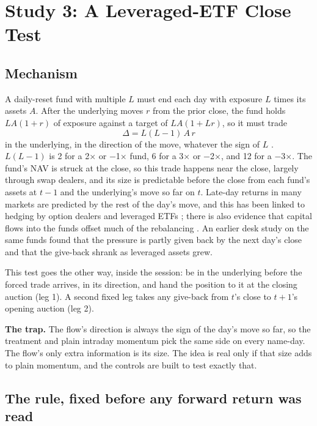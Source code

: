 \documentclass[10pt, a4paper, twocolumn]{article}
\begin{document}
\section{Study 3: A Leveraged-ETF Close Test}
\label{sec:etf}

\subsection{Mechanism}

A daily-reset fund with multiple $L$ must end each day with exposure $L$ times its assets $A$. After the underlying moves $r$ from the prior close, the fund holds $LA(1+r)$ of exposure against a target of $LA(1+Lr)$, so it must trade
\begin{equation}
\Delta = L(L-1)\,A\,r
\end{equation}
in the underlying, in the direction of the move, whatever the sign of $L$ \cite{cheng2009}. $L(L-1)$ is 2 for a 2$\times$ or $-$1$\times$ fund, 6 for a 3$\times$ or $-$2$\times$, and 12 for a $-$3$\times$. The fund's NAV is struck at the close, so this trade happens near the close, largely through swap dealers, and its size is predictable before the close from each fund's assets at $t-1$ and the underlying's move so far on $t$. Late-day returns in many markets are predicted by the rest of the day's move, and this has been linked to hedging by option dealers and leveraged ETFs \cite{gao2018,baltussen2021}; there is also evidence that capital flows into the funds offset much of the rebalancing \cite{ivanov2018}. An earlier desk study on the same funds found that the pressure is partly given back by the next day's close and that the give-back shrank as leveraged assets grew.

This test goes the other way, inside the session: be in the underlying before the forced trade arrives, in its direction, and hand the position to it at the closing auction (leg 1). A second fixed leg takes any give-back from $t$'s close to $t+1$'s opening auction (leg 2).

\textbf{The trap.} The flow's direction is always the sign of the day's move so far, so the treatment and plain intraday momentum pick the same side on every name-day. The flow's only extra information is its size. The idea is real only if that size adds to plain momentum, and the controls are built to test exactly that.

\subsection{The rule, fixed before any forward return was read}
\end{document}
